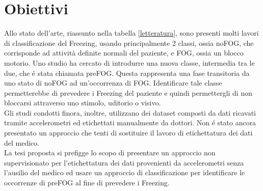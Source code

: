 


\chapter[Obiettivi]{Obiettivi}\label{chap4:Goals}
Allo stato dell'arte, riassunto nella tabella \ref{letteratura}, sono presenti molti lavori di classificazione del Freezing, usando principalmente 2 classi, ossia noFOG, che corrisponde ad attività definite normali del paziente, e FOG, ossia un blocco motorio. Uno studio ha cercato di introdurre una nuova classe, intermedia tra le due, che é stata chiamata preFOG. Questa rappresenta una fase transitoria da uno stato di noFOG ad un'occorrenza di FOG. Identificare tale classe permetterebbe di prevedere i Freezing del paziente e quindi permettergli di non bloccarsi attraverso uno stimolo, uditorio o visivo.\\
Gli studi condotti finora, inoltre, utilizzano dei dataset composti da dati ricavati tramite accelerometri ed etichettati manualmente da dottori. Non é stato ancora presentato un approccio che tenti di sostituire il lavoro di etichettatura dei dati del medico.\\
La tesi proposta si prefigge lo scopo di presentare un approccio non supervisionato per l'etichettatura dei dati provenienti da accelerometri senza l'ausilio del medico ed usare un approccio di classificazione per identificare le occorrenze di preFOG al fine di prevedere i Freezing.\\
%
